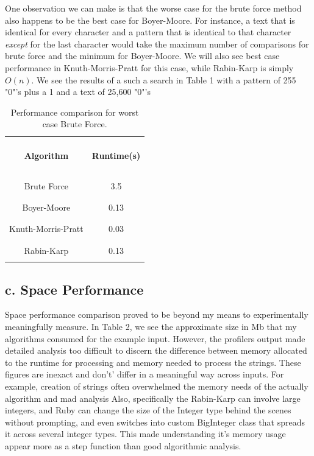 \documentclass{chi2005}
\begin{document}
One observation we can make is that the worse case for the brute force method also happens to be the best case for Boyer-Moore. For instance, a text that is identical for every character and a pattern that is identical to that character \emph{except} for the last character would take the maximum number of comparisons for brute force and the minimum for Boyer-Moore. We will also see best case performance in Knuth-Morris-Pratt for this case, while Rabin-Karp is simply $O(n)$. We see the results of a such a search in Table 1 with a pattern of 255 "0"'s  plus a 1 and a text of 25,600 "0"'s

\begin{table}
  \begin{center}
  \begin{tabular}{|c|c|}
  \hline
          &   \\
  {\bf Algorithm} & \parbox{1in}{\begin{center}\bf Runtime(s) \end{center}}\\
          &   \\
  \hline
          &   \\
  Brute Force  & 3.5  \\
          &   \\
  \hline
          &    \\
  Boyer-Moore & 0.13 \\
          &    \\
  \hline
          &    \\
  Knuth-Morris-Pratt & 0.03 \\
          &    \\
   \hline
          &    \\
  Rabin-Karp & 0.13 \\
          &    \\
  \hline
  \end{tabular}
  \end{center}
  \caption{Performance comparison for worst case Brute Force.}
  \label{table1}
\end{table}


\subsection{c. Space Performance}

Space performance comparison proved to be beyond my means to experimentally meaningfully measure. In Table 2, we see the approximate size in Mb that my algorithms consumed for the example input. However, the profilers output made detailed analysis too difficult to discern the difference between memory allocated to the runtime for processing and memory needed to process the strings. These figures are inexact and don't' differ in a meaningful way across inputs. For example, creation of strings often overwhelmed the memory needs of the actually algorithm and mad analysis Also, specifically the Rabin-Karp can involve large integers, and Ruby can change the size of the Integer type behind the scenes without prompting, and even switches into custom BigInteger class that spreads it across several integer types. This made understanding it's memory usage appear more as a step function than good algorithmic analysis.
\end{document}
